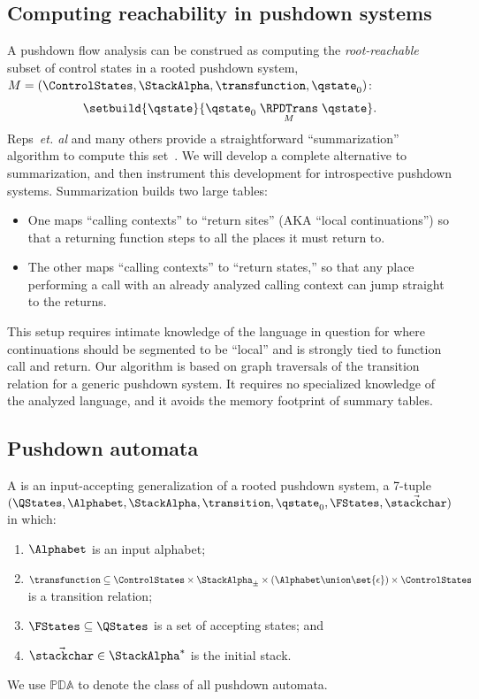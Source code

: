 \subsection{Computing reachability in pushdown systems}

A pushdown flow analysis 
can be construed as
  computing the \emph{root-reachable}
  subset of control states in a rooted pushdown system, 
  $M = (\ControlStates,\StackAlpha,\transfunction,\qstate_0)$:
\begin{align*}
  \setbuild{\qstate}{
    \qstate_0 
      \mathrel{\underset{M}{\RPDTrans}}
    \qstate
  }\text.
\end{align*}
Reps~\emph{et. al} and many others provide a straightforward ``summarization'' algorithm
to compute this set~\cite{mattmight:Bouajjani:1997:PDA-Reachability,dvanhorn:Kodumal2004Set,mattmight:Reps:1998:CFL,mattmight:Reps:2005:Weighted-PDA}.
We will develop a complete alternative to summarization, and then instrument this development for introspective pushdown systems.
Summarization builds two large tables: 
\begin{itemize}
\item{One maps ``calling contexts'' to ``return sites'' (AKA ``local
  continuations'') so that a returning function steps to all the
  places it must return to.}
\item{The other maps ``calling contexts'' to
  ``return states,'' so that any place performing a call with an
  already analyzed calling context can jump straight to the returns.}
\end{itemize}
This setup requires intimate knowledge of the language in question for where continuations should be segmented to be ``local'' and is strongly tied to function call and return.
Our algorithm is based on graph traversals of the transition relation for a generic pushdown system.
It requires no specialized knowledge of the analyzed language, and it avoids the memory footprint of summary tables.


\subsection{Pushdown automata}
A  is an input-accepting generalization
of a rooted pushdown system, a 7-tuple
$(\QStates,\Alphabet,\StackAlpha,\transition,\qstate_0,\FStates,\vec{\stackchar})$ in which:
\begin{enumerate}
\item $\Alphabet$ is an input alphabet; 

\item $\transfunction \subseteq \ControlStates \times \StackAlpha_\pm
  \times (\Alphabet \union \set{\epsilon}) \times \ControlStates$ is a
  transition relation; 

\item $\FStates \subseteq \QStates$ is a set of accepting states; and

\item $\vec{\stackchar} \in \StackAlpha^*$ is the initial stack.

\end{enumerate}
We use $\mathbb{PDA}$ to denote the class of all pushdown automata.

